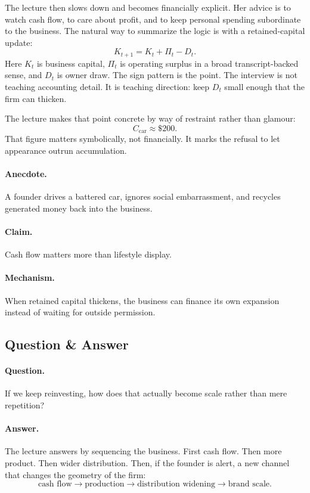 The lecture then slows down and becomes financially explicit. Her advice is to watch cash flow, to care about profit, and to keep personal spending subordinate to the business. The natural way to summarize the logic is with a retained-capital update:
\begin{equation}
K_{t+1} = K_t + \Pi_t - D_t.
\end{equation}
Here \(K_t\) is business capital, \(\Pi_t\) is operating surplus in a broad transcript-backed sense, and \(D_t\) is owner draw. The sign pattern is the point. The interview is not teaching accounting detail. It is teaching direction: keep \(D_t\) small enough that the firm can thicken.

The lecture makes that point concrete by way of restraint rather than glamour:
\begin{equation}
C_{\mathrm{car}} \approx \$200.
\end{equation}
That figure matters symbolically, not financially. It marks the refusal to let appearance outrun accumulation.

\paragraph{Anecdote.} A founder drives a battered car, ignores social embarrassment, and recycles generated money back into the business.

\paragraph{Claim.} Cash flow matters more than lifestyle display.

\paragraph{Mechanism.} When retained capital thickens, the business can finance its own expansion instead of waiting for outside permission.

\subsection{Question \& Answer}

\paragraph{Question.} If we keep reinvesting, how does that actually become scale rather than mere repetition?

\paragraph{Answer.} The lecture answers by sequencing the business. First cash flow. Then more product. Then wider distribution. Then, if the founder is alert, a new channel that changes the geometry of the firm:
\begin{equation}
\text{cash flow} \rightarrow \text{production} \rightarrow \text{distribution widening} \rightarrow \text{brand scale}.
\end{equation}


